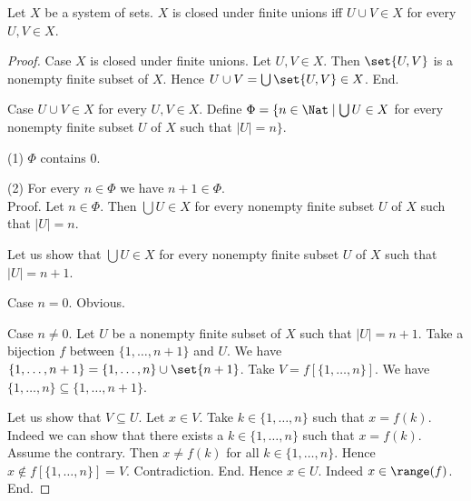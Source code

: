 \begin{forthel}
  \begin{proposition}
    Let $X$ be a system of sets.
    $X$ is closed under finite unions iff $U \cup V \in X$ for every $U, V \in X$.
  \end{proposition}
  \begin{proof}
    Case $X$ is closed under finite unions.
      Let $U, V \in X$.
      Then $\set{U, V}$ is a nonempty finite subset of $X$.
      Hence $U \cup V = \bigcup \set{U, V} \in X$.
    End.

    Case $U \cup V \in X$ for every $U, V \in X$.
      Define $\Phi = \{ n \in \Nat \mid \bigcup U \in X$ for every nonempty finite
      subset $U$ of $X$ such that $|U| = n \}$.

      (1) $\Phi$ contains $0$.

      (2) For every $n \in \Phi$ we have $n + 1 \in \Phi$. \\
      Proof.
        Let $n \in \Phi$.
        Then $\bigcup U \in X$ for every nonempty finite subset $U$ of $X$ such that
        $|U| = n$.

        Let us show that $\bigcup U \in X$ for every nonempty finite subset $U$ of
        $X$ such that $|U| = n + 1$.

          Case $n = 0$. Obvious.

          Case $n \neq 0$.
            Let $U$ be a nonempty finite subset of $X$ such that $|U| = n + 1$.
            Take a bijection $f$ between $\{1, \dots, n + 1 \}$ and $U$.
            We have $\{ 1, \dots, n + 1 \} = \{ 1, \dots, n \} \cup \set{n + 1}$.
            Take $V = f[\{ 1, \dots, n \}]$.
            We have $\{ 1, \dots, n \} \subseteq \{ 1, \dots, n + 1 \}$.

            Let us show that $V \subseteq U$.
              Let $x \in V$.
              Take $k \in \{ 1, \dots, n \}$ such that $x = f(k)$.
              Indeed we can show that there exists a $k \in \{ 1, \dots, n \}$ such that $x = f(k)$.
                Assume the contrary.
                Then $x \neq f(k)$ for all $k \in \{ 1, \dots, n \}$.
                Hence $x \notin f[\{ 1, \dots, n \}] = V$.
                Contradiction.
              End.
              Hence $x \in U$.
              Indeed $x \in \range(f)$.
            End.


\end{proof}
\end{forthel}
